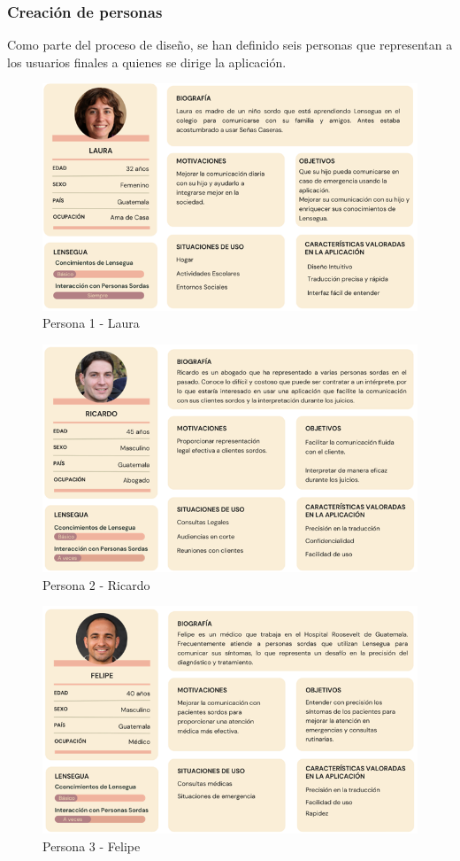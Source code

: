 \subsubsection{Creación de personas}

Como parte del proceso de diseño, se han definido seis personas que representan a los usuarios finales a quienes se dirige la aplicación. 

\begin{figure} [H]
    \centering
    \includegraphics[width=0.8\linewidth]{figuras/persona_laura.png}
    \caption{Persona 1 - Laura}
    \label{fig:enter-label}
\end{figure}

\begin{figure} [H]
    \centering
    \includegraphics[width=0.8\linewidth]{figuras/ricardo_persona.png}
    \caption{Persona 2 - Ricardo}
    \label{fig:enter-label}
\end{figure}

\begin{figure} [H]
    \centering
    \includegraphics[width=0.8\linewidth]{figuras/felipe_persona.png}
    \caption{Persona 3 - Felipe}
    \label{fig:enter-label}
\end{figure}

